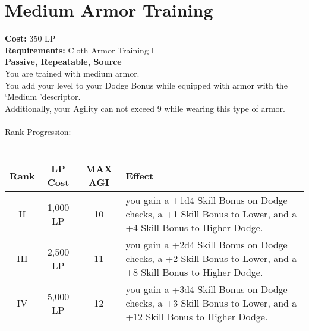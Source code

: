 \section{Medium Armor Training}\label{perk:mediumArmorTraining}
\textbf{Cost:} 350 LP\\
\textbf{Requirements:} Cloth Armor Training I\\
\textbf{Passive, Repeatable, Source}\\
You are trained with medium armor.\\
You add your level to your Dodge Bonus while equipped with armor with the \lq Medium \rq descriptor.\\
Additionally, your Agility can not exceed 9 while wearing this type of armor.\\
\\
Rank Progression:\\
\\
\begin{longtable}{c | c | c | p{6cm}}
    Rank & LP Cost & MAX AGI & Effect
    \\
    \hline
    II
    & 1,000 LP
    & 10
    & you gain a +1d4 Skill Bonus on Dodge checks, a +1 Skill Bonus to Lower, and a +4 Skill Bonus to Higher Dodge.
    \\
    III
    & 2,500 LP
    & 11
    & you gain a +2d4 Skill Bonus on Dodge checks, a +2 Skill Bonus to Lower, and a +8 Skill Bonus to Higher Dodge.
    \\
    IV
    & 5,000 LP
    & 12
    & you gain a +3d4 Skill Bonus on Dodge checks, a +3 Skill Bonus to Lower, and a +12 Skill Bonus to Higher Dodge.
    \\
\end{longtable}